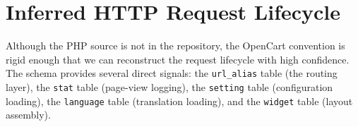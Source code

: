 \documentclass[11pt,a4paper]{article}
\begin{document}
\section{Inferred HTTP Request Lifecycle}\label{sec:lifecycle}

Although the PHP source is not in the repository, the OpenCart
convention is rigid enough that we can reconstruct the request
lifecycle with high confidence. The schema provides several direct
signals: the \texttt{url\_alias} table (the routing layer), the
\texttt{stat} table (page-view logging), the \texttt{setting}
table (configuration loading), the \texttt{language} table
(translation loading), and the \texttt{widget} table (layout
assembly).
\end{document}
